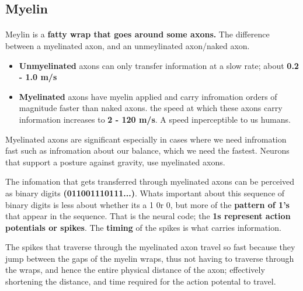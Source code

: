 \documentclass[12pt, a4paper]{article}
\begin{document}
\subsection{Myelin}
\paragraph*{}
Meylin is a \textbf{fatty wrap that goes around some axons.} The difference between a myelinated axon, and an
unmeylinated axon/naked axon.
\begin{itemize}
    \item \textbf{Unmyelinated} axons can only transfer information at a slow rate; about
    \textbf{0.2 - 1.0 m/s}
    \item \textbf{Myelinated} axons have myelin applied and carry infromation orders of magnitude faster than naked axons.
    the speed at which these axons carry information increases to \textbf{2 - 120 m/s}. A speed inperceptible to us humans.
\end{itemize}
Myelinated axons are significant especially in cases where we need infromation fast such as infromation about our balance, which we need the fastest. Neurons
that support a posture against gravity, use myelinated axons.

The infomation that gets transferred through myelinated axons can be perceived as binary digits
\textbf{(011001110111...)}. Whats important about this sequence of binary digits is less about whether its a 1 0r 0, but 
more of the \textbf{pattern of 1's} that appear in the sequence. That is the neural code; the \textbf{1s represent
action potentials or spikes}. The \textbf{timing} of the spikes is what carries information.

The spikes that traverse through the myelinated axon travel so fast because they jump between the gaps of
the myelin wraps, thus not having to traverse through the wraps, and hence the entire physical
distance of the axon; effectively shortening the distance, and time required for the action potental to travel.
\\
\end{document}
